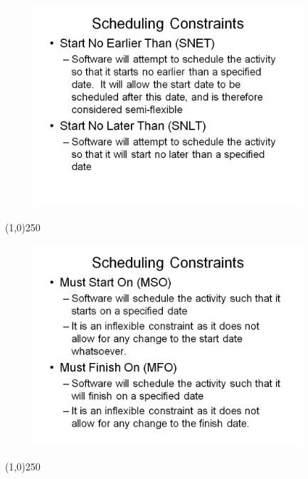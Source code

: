 \begin{frame}
\begin{figure}
	\centering
		\includegraphics[width = 10.0cm]{oldnotes/Slide186.jpg}
\end{figure}
\end{frame}
\begin{center}\line(1,0){250}\end{center}




\begin{frame}
\begin{figure}
	\centering
		\includegraphics[width = 10.0cm]{oldnotes/Slide187.jpg}
\end{figure}
\end{frame}
\begin{center}\line(1,0){250}\end{center}





